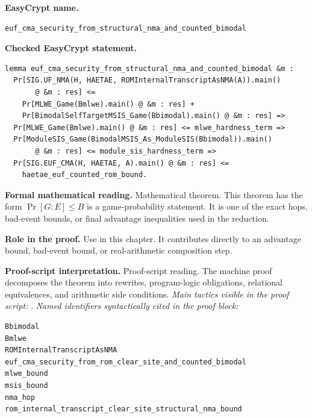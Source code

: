 \begin{formaltheorem}
\noindent\textbf{EasyCrypt name.}
\begin{lstlisting}[language=EasyCrypt,basicstyle=\ttfamily\scriptsize]
euf_cma_security_from_structural_nma_and_counted_bimodal
\end{lstlisting}
\noindent\textbf{Checked EasyCrypt statement.}
\begin{lstlisting}[language=EasyCrypt,basicstyle=\ttfamily\scriptsize]
lemma euf_cma_security_from_structural_nma_and_counted_bimodal &m :
  Pr[SIG.UF_NMA(H, HAETAE, ROMInternalTranscriptAsNMA(A)).main()
       @ &m : res] <=
    Pr[MLWE_Game(Bmlwe).main() @ &m : res] +
    Pr[BimodalSelfTargetMSIS_Game(Bbimodal).main() @ &m : res] =>
  Pr[MLWE_Game(Bmlwe).main() @ &m : res] <= mlwe_hardness_term =>
  Pr[ModuleSIS_Game(BimodalMSIS_As_ModuleSIS(Bbimodal)).main()
       @ &m : res] <= module_sis_hardness_term =>
  Pr[SIG.EUF_CMA(H, HAETAE, A).main() @ &m : res] <=
    haetae_euf_counted_rom_bound.
\end{lstlisting}
\noindent\textbf{Formal mathematical reading.}
Mathematical theorem. This theorem has the form \(\Pr[G:E] \le B\) is a game-probability statement.  It is one of the exact hops, bad-event bounds, or final advantage inequalities used in the reduction.

\noindent\textbf{Role in the proof.}
Use in this chapter. It contributes directly to an advantage bound, bad-event bound, or real-arithmetic composition step.

\noindent\textbf{Proof-script interpretation.}
Proof-script reading. The machine proof decomposes the theorem into rewrites, program-logic obligations, relational equivalences, and arithmetic side conditions.
\emph{Main tactics visible in the proof script:} .
\emph{Named identifiers syntactically cited in the proof block:}
\begin{lstlisting}[language=EasyCrypt,basicstyle=\ttfamily\scriptsize]
Bbimodal
Bmlwe
ROMInternalTranscriptAsNMA
euf_cma_security_from_rom_clear_site_and_counted_bimodal
mlwe_bound
msis_bound
nma_hop
rom_internal_transcript_clear_site_structural_nma_bound
\end{lstlisting}

\end{formaltheorem}

